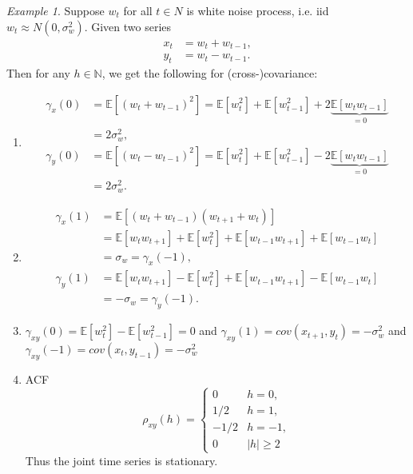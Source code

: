 \documentclass[10pt]{article}
\theoremstyle{remark}
\newtheorem{Example}{Example}[section]
\theoremstyle{plain}
\newcommand{\N}{\mathbb{N}}
\numberwithin{equation}{section}
\renewcommand{\geq}{\geqslant}
\begin{document}
\begin{Example}
	Suppose $w_t$ for all $t\in N$ is white noise process, i.e. iid $w_t \approx N(0, \sigma_w^2)$. Given two series
	\begin{align*}
		x_t &= w_t + w_{t-1},\\
		y_t &= w_t - w_{t-1}.
	\end{align*}
	Then for any $h\in \N$, we get the following for (cross-)covariance:
	\begin{enumerate}
		\item \begin{align*}
			\gamma_x(0) &= \mathds{E}[(w_t + w_{t-1})^2] =  \mathds{E}[w_t^2] + \mathds{E}[w_{t-1}^2] + 2\underbrace{ \mathds{E}[w_t w_{t-1}]}_{=0}\\
			& = 2\sigma_w^2,
			\\
			\gamma_y(0) &= \mathds{E}[(w_t - w_{t-1})^2] =  \mathds{E}[w_t^2] + \mathds{E}[w_{t-1}^2] - 2\underbrace{ \mathds{E}[w_t w_{t-1}]}_{=0}\\
			& = 2\sigma_w^2.
		\end{align*}
		\item 
		\begin{align*}
			\gamma_x (1) &= \mathds{E}\left[(w_t + w_{t-1}) (w_{t+1} + w_t) \right] \\
			& = \mathds{E}[w_tw_{t+1}] + \mathds{E}[w_t^2] + \mathds{E}[w_{t-1} w_{t+1}] + \mathds{E}[w_{t-1}w_t]\\
			& = \sigma_w = \gamma_x(-1),
			\\
			\gamma_y (1) &=  \mathds{E}[w_tw_{t+1}] - \mathds{E}[w_t^2] + \mathds{E}[w_{t-1} w_{t+1}] - \mathds{E}[w_{t-1}w_t]\\
			&  = - \sigma_w = \gamma_y(-1).
		\end{align*}
		
		\item $\gamma_{xy}(0) =  \mathds{E}[w_t^2]  -  \mathds{E}[w_{t-1}^2]  = 0$ and $\gamma_{xy} (1) = cov (x_{t+1}, y_t) = -\sigma_w^2$ and $\gamma_{xy} (-1) = cov (x_{t}, y_{t-1}) = -\sigma_w^2$
		
		\item ACF
		\begin{equation}
			\rho_{xy} (h) = 
			\begin{cases}
				0 & h=0,\\
				1/2 & h=1,\\
				-1/2 & h=-1,\\
				0 & |h| \geq 2
			\end{cases}
		\end{equation}
		Thus the joint time series is stationary.
	\end{enumerate}
\end{Example}
\end{document}
